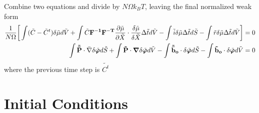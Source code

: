 \documentclass[12pt,3p]{article}
\numberwithin{equation}{section}
\begin{document}
Combine two equations and divide by $N \Omega k_B T$, leaving the final normalized weak form 
\begin{align*}
\frac{1}{N \Omega} \bigg[ \int (\tilde{C} - \tilde{C}^t) \delta \tilde{\mu} d\tilde{V} + \int \tilde{C} \mathbf{F^{-1}} \mathbf{F^{-T}} \pdv{ \tilde{\mu} }{\tilde{X}} \cdot \frac{\delta \tilde{\mu}}{\delta \tilde{X}} \Delta \tilde{t} d\tilde{V} - \int \tilde{i} \delta \tilde{\mu} \Delta \tilde{t} d\tilde{S} - \int \tilde{r} \delta \tilde{\mu}  \Delta \tilde{t} d \tilde{V} \bigg] &= 0 \\
\int \mathbf{\tilde{\bar{P}}} \cdot \bar{\nabla} \delta \tilde{\boldsymbol\varphi} d\tilde{S} + \int \mathbf{\tilde{P}}  \cdot \grad \delta \tilde{\boldsymbol\varphi} d\tilde{V} - \int \mathbf{\tilde{\bar{b}}_o} \cdot \delta \tilde{\boldsymbol\varphi} d \tilde{S} - \int \mathbf{\tilde{b}_o} \cdot \delta \tilde{\boldsymbol\varphi} d\tilde{V} &= 0
\end{align*}
where the previous time step is $\tilde{C^t}$

\section{Initial Conditions}
\vspace{-2ex}
\end{document}
